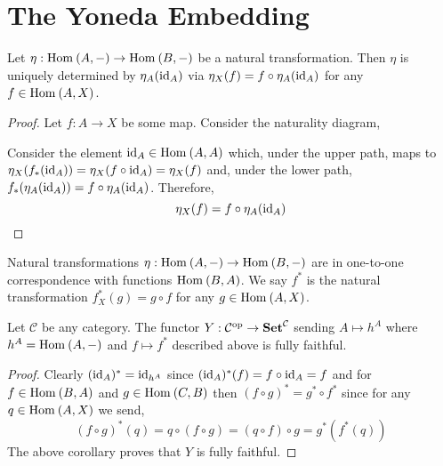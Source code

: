 \documentclass[12pt]{article}
\newcommand{\C}{\mathcal{C}}
\newcommand{\Set}{\mathbf{Set}}
\begin{document}
\section{The Yoneda Embedding}

\begin{lemma}
Let $\eta : \mathrm{Hom}_{} \left( A, - \right) \to \mathrm{Hom}_{} \left( B, - \right)$ be a natural transformation. Then $\eta$ is uniquely determined by $\eta_A(\mathrm{id}_A)$ via $\eta_X(f) = f \circ \eta_A(\mathrm{id}_A)$ for any $f \in \mathrm{Hom}_{} \left( A, X \right)$.  
\end{lemma}

\begin{proof}
Let $f : A \to X$ be some map.
Consider the naturality diagram,
\begin{center}
\end{center}
Consider the element $\mathrm{id}_A \in \mathrm{Hom}_{} \left( A, A \right)$ which, under the upper path, maps to $\eta_X (f_*(\mathrm{id}_A)) = \eta_X(f \circ \mathrm{id}_A) = \eta_X(f)$ and, under the lower path, $f_*(\eta_A(\mathrm{id}_A)) = f \circ \eta_A(\mathrm{id}_A)$. Therefore,
\[ \eta_X(f) = f \circ \eta_A(\mathrm{id}_A) \]
\end{proof}

\begin{corollary}
Natural transformations $\eta : \mathrm{Hom}_{} \left( A, - \right) \to \mathrm{Hom}_{} \left( B, - \right)$ are in one-to-one correspondence with functions $\mathrm{Hom}_{} \left( B, A \right)$. We say $f^*$ is the natural transformation $f^*_X(g) = g \circ f$ for any $g \in \mathrm{Hom}_{} \left( A, X \right)$.  
\end{corollary}

\begin{theorem}
Let $\C$ be any category. The functor $Y : \C^{\op} \to \Set^{\C}$ sending $A \mapsto h^A$ where $h^A = \mathrm{Hom}_{} \left( A, - \right)$ and $f \mapsto f^*$ described above is fully faithful.
\end{theorem}

\begin{proof}
Clearly $(\mathrm{id}_A)^* = \mathrm{id}_{h^A}$ since $(\mathrm{id}_A)^*(f) = f \circ \mathrm{id}_A = f$ and for $f \in \mathrm{Hom}_{} \left( B, A \right)$ and $g \in \mathrm{Hom}_{} \left( C, B \right)$ then $(f \circ g)^* = g^* \circ f^*$ since for any $q \in \mathrm{Hom}_{} \left( A, X \right)$ we send,
\[ (f \circ g)^*(q) = q \circ (f \circ g) = (q \circ f) \circ g = g^*(f^*(q)) \]
The above corollary proves that $Y$ is fully faithful.    
\end{proof}
\end{document}
